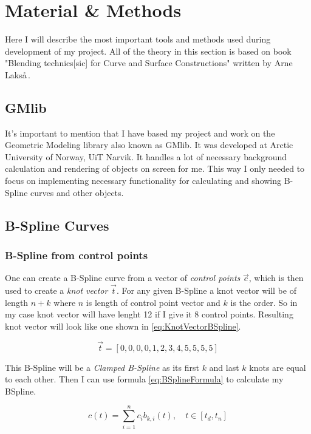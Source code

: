\documentclass[a4paper,12pt]{extarticle}
\begin{document}
\section{Material \& Methods}
Here I will describe the most important tools and methods used during development of my project. All of the theory in this section is based on book "Blending technics[sic] for Curve and Surface Constructions" written by Arne Laks\aa \,\citep{Laksa2012}.

\subsection{GMlib}
It's important to mention that I have based my project and work on the Geometric Modeling library also known as GMlib. It was developed at Arctic University of Norway, UiT Narvik. It handles a lot of necessary background calculation and rendering of objects on screen for me. This way I only needed to focus on implementing necessary functionality for calculating and showing B-Spline curves and other objects.

\subsection{B-Spline Curves}
\subsubsection{B-Spline from control points}
One can create a B-Spline curve from a vector of \emph{control points} $\vec{c}$, which is then used to create a \emph{knot vector} $\vec{t}$. For any given B-Spline a knot vector will be of length $n+k$ where $n$ is length of control point vector and $k$ is the order. So in my case knot vector will have lenght 12 if I give it 8 control points. Resulting knot vector will look like one shown in \cref{eq:KnotVectorBSpline}.

\begin{equation}
\vec{t}= [0,0,0,0,1,2,3,4,5,5,5,5]
\label{eq:KnotVectorBSpline}
\end{equation}

This B-Spline will be a \emph{Clamped B-Spline} as its first $k$ and last $k$ knots are equal to each other. Then I can use formula \cref{eq:BSplineFormula} to calculate my BSpline.

\begin{equation}
c(t)= \sum_{i=1}^{n} c_i b_{k,i}(t), \quad t \in \left[t_d,t_n\right]
\label{eq:BSplineFormula}
\end{equation}
\end{document}
